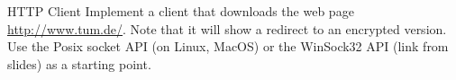 \begin{task}{HTTP Client}{}{}
  Implement a client that downloads the web page \url{http://www.tum.de/}. Note that it will show a redirect to
  an encrypted version.
  Use the Posix socket API (on Linux, MacOS) or the WinSock32 API (link from slides) as a starting point.
  
\end{task}
